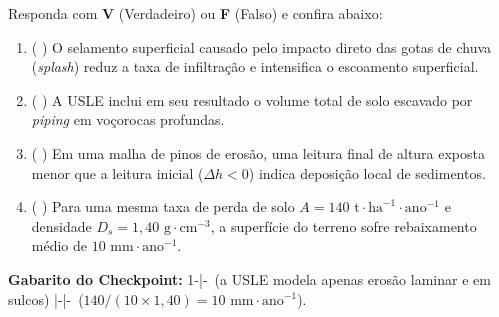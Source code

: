 \begin{boxTeste}
Responda com \textbf{V} (Verdadeiro) ou \textbf{F} (Falso) e confira abaixo:
\begin{enumerate}[leftmargin=1.6em, itemsep=3pt]
  \item ( \quad ) O selamento superficial causado pelo impacto direto das gotas de chuva (\textit{splash}) reduz a taxa de infiltração e intensifica o escoamento superficial.
  \item ( \quad ) A USLE inclui em seu resultado o volume total de solo escavado por \textit{piping} em voçorocas profundas.
  \item ( \quad ) Em uma malha de pinos de erosão, uma leitura final de altura exposta menor que a leitura inicial ($\Delta h < 0$) indica deposição local de sedimentos.
  \item ( \quad ) Para uma mesma taxa de perda de solo $A = 140\text{ t}\cdot\text{ha}^{-1}\cdot\text{ano}^{-1}$ e densidade $D_s = 1{,}40\text{ g}\cdot\text{cm}^{-3}$, a superfície do terreno sofre rebaixamento médio de $10\text{ mm}\cdot\text{ano}^{-1}$.
\end{enumerate}
\vspace{4pt}
{\footnotesize\textbf{Gabarito do Checkpoint:} 1-\V \quad|-\F\ (a USLE modela apenas erosão laminar e em sulcos) \quad|-\V \quad|-\V\ ($140 / (10 \times 1{,}40) = 10\text{ mm}\cdot\text{ano}^{-1}$).}
\end{boxTeste}
